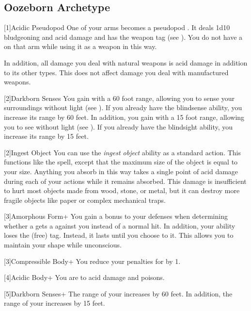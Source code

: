 \subsection{Oozeborn Archetype}

[1]{Acidic Pseudopod} One of your arms becomes a pseudopod .
It deals 1d10 bludgeoning and acid damage and has the  weapon tag (see ).
You do not have a  on that arm while using it as a weapon in this way.

In addition, all damage you deal with natural weapons is acid damage in addition to its other types.
This does not affect damage you deal with manufactured weapons.

[2]{Darkborn Senses} You gain  with a 60 foot range, allowing you to sense your surroundings without light (see ).
If you already have the blindsense ability, you increase its range by 60 feet.
In addition, you gain  with a 15 foot range, allowing you to see without light (see ).
If you already have the blindsight ability, you increase its range by 15 feet.

[2]{Ingest Object} You can use the \textit{ingest object} ability as a standard action.
This functions like the  spell, except that the maximum size of the object is equal to your size.
Anything you absorb in this way takes a single point of  acid damage during each of your actions while it remains absorbed.
This damage is insufficient to hurt most objects made from wood, stone, or metal, but it can destroy more fragile objects like paper or complex mechanical traps.

[3]{Amorphous Form+} You gain a  bonus to your defenses when determining whether a  gets a  against you instead of a normal hit.
In addition, your  ability loses the  (free) tag.
Instead, it lasts until you choose to  it.
This allows you to maintain your shape while unconscious.

[3]{Compressible Body+} You reduce your penalties for \squeezing by 1.

[4]{Acidic Body+} You are  to acid damage and poisons.

[5]{Darkborn Senses+} The range of your  increases by 60 feet.
In addition, the range of your  increases by 15 feet.

